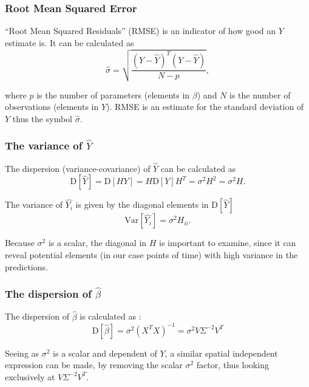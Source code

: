 \subsubsection{Root Mean Squared Error}

``Root Mean Squared Residuals'' (RMSE) is an indicator of how good an $Y$ estimate is.
It can be calculated as
\begin{equation}
\hat{\sigma} = \sqrt{\frac{\left(Y - \hat{Y}\right)^T \left(Y - \hat{Y}\right)}{N-p}},
\end{equation}

where $p$ is the number of parameters (elements in $\beta$) and $N$ is the number of observations (elements in $Y$).
RMSE is an estimate for the standard deviation of $Y$ \cite[theorem~3.4]{time-series-analysis} thus the symbol $\hat{\sigma}$.


\subsubsection{The variance of $\hat{Y}$}

The dispersion (variance-covariance) of $\hat{Y}$ can be calculated as
\begin{equation}
\mathrm{D}[\hat{Y}] = \mathrm{D}[H Y] = H \mathrm{D}[Y] H^T = \sigma^2 H^2 = \sigma^2 H.
\end{equation}

The variance of $\hat{Y_i}$ is given by the diagonal elements in $\mathrm{D}[\hat{Y}]$
\begin{equation}
\mathrm{Var}[\hat{Y_i}] = \sigma^2 H_{ii}.
\end{equation}

Because $\sigma^2$ is a scalar, the diagonal in $H$ is important to examine, since it can reveal potential elements (in our case points of time) with high variance in the predictions.

\subsubsection{The dispersion of $\hat{\beta}$}

The dispersion of $\hat{\beta}$ is calculated as \cite[theorem~3.2]{time-series-analysis}:
\begin{equation}
\mathrm{D}[\hat{\beta}] = \sigma^2 (X^T X)^{-1} = \sigma^2 V \Sigma^{-2} V^T
\end{equation}

Seeing as $\sigma^2$ is a scalar and dependent of $Y$, a similar spatial independent expression can be made, by removing the scalar $\sigma^2$  factor, thus looking exclusively at $V \Sigma^{-2} V^T$.


